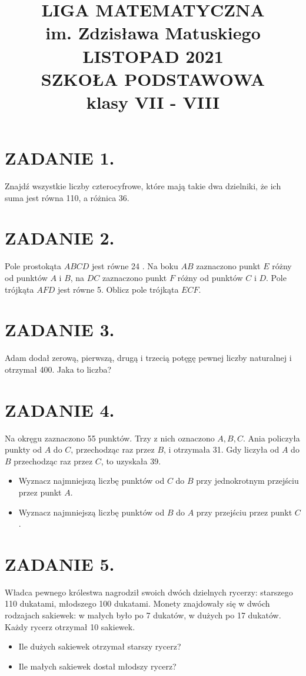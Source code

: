 \documentclass[10pt]{article}
\title{LIGA MATEMATYCZNA \\
 im. Zdzisława Matuskiego \\
 LISTOPAD 2021 \\
 SZKOŁA PODSTAWOWA \\
 klasy VII - VIII }
\author{}
\date{}
\begin{document}
\maketitle
\section*{ZADANIE 1.}
Znajdź wszystkie liczby czterocyfrowe, które mają takie dwa dzielniki, że ich suma jest równa 110, a różnica 36.

\section*{ZADANIE 2.}
Pole prostokąta \(A B C D\) jest równe 24 . Na boku \(A B\) zaznaczono punkt \(E\) różny od punktów \(A\) i \(B\), na \(D C\) zaznaczono punkt \(F\) różny od punktów \(C\) i \(D\). Pole trójkąta \(A F D\) jest równe 5. Oblicz pole trójkąta \(E C F\).

\section*{ZADANIE 3.}
Adam dodał zerową, pierwszą, drugą i trzecią potęgę pewnej liczby naturalnej i otrzymał 400. Jaka to liczba?

\section*{ZADANIE 4.}
Na okręgu zaznaczono 55 punktów. Trzy z nich oznaczono \(A, B, C\). Ania policzyła punkty od \(A\) do \(C\), przechodząc raz przez \(B\), i otrzymała 31. Gdy liczyła od \(A\) do \(B\) przechodząc raz przez \(C\), to uzyskała 39.

\begin{itemize}
  \item Wyznacz najmniejszą liczbę punktów od \(C\) do \(B\) przy jednokrotnym przejściu przez punkt \(A\).
  \item Wyznacz najmniejszą liczbę punktów od \(B\) do \(A\) przy przejściu przez punkt \(C\).
\end{itemize}

\section*{ZADANIE 5.}
Władca pewnego królestwa nagrodził swoich dwóch dzielnych rycerzy: starszego 110 dukatami, młodszego 100 dukatami. Monety znajdowały się w dwóch rodzajach sakiewek: w małych było po 7 dukatów, w dużych po 17 dukatów. Każdy rycerz otrzymał 10 sakiewek.

\begin{itemize}
  \item Ile dużych sakiewek otrzymał starszy rycerz?
  \item Ile małych sakiewek dostał młodszy rycerz?
\end{itemize}
\end{document}
